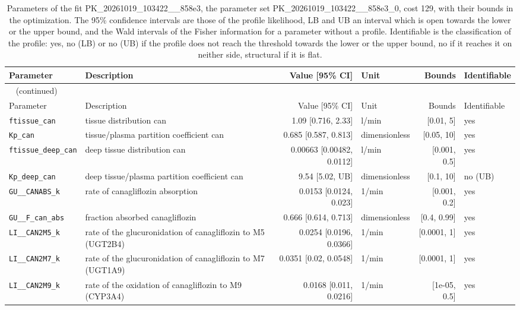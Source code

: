 \documentclass{article}
\begin{document}
\begin{longtable}{llrlrl}
\caption{Parameters of the fit PK\_20261019\_103422\_\_858e3, the parameter set PK\_20261019\_103422\_\_858e3\_0, cost 129, with their bounds in the optimization. The 95\% confidence intervals are those of the profile likelihood, LB and UB an interval which is open towards the lower or the upper bound, and the Wald intervals of the Fisher information for a parameter without a profile. Identifiable is the classification of the profile: yes, no (LB) or no (UB) if the profile does not reach the threshold towards the lower or the upper bound, no if it reaches it on neither side, structural if it is flat.}\label{tab:parameters:PK_20261019_103422__858e3} \\
\toprule
Parameter & Description & Value [95\% CI] & Unit & Bounds & Identifiable \\
\midrule
\endfirsthead
\multicolumn{6}{l}{\small\tablename~\thetable{} (continued)} \\
\toprule
Parameter & Description & Value [95\% CI] & Unit & Bounds & Identifiable \\
\midrule
\endhead
\bottomrule
\endlastfoot
\texttt{ftissue\_can} & tissue distribution can & 1.09 [0.716, 2.33] & l/min & [0.01, 5] & yes \\
\texttt{Kp\_can} & tissue/plasma partition coefficient can & 0.685 [0.587, 0.813] & dimensionless & [0.05, 10] & yes \\
\texttt{ftissue\_deep\_can} & deep tissue distribution can & 0.00663 [0.00482, 0.0112] & l/min & [0.001, 0.5] & yes \\
\texttt{Kp\_deep\_can} & deep tissue/plasma partition coefficient can & 9.54 [5.02, UB] & dimensionless & [0.1, 10] & no (UB) \\
\texttt{GU\_\_CANABS\_k} & rate of canagliflozin absorption & 0.0153 [0.0124, 0.023] & 1/min & [0.001, 0.2] & yes \\
\texttt{GU\_\_F\_can\_abs} & fraction absorbed canagliflozin & 0.666 [0.614, 0.713] & dimensionless & [0.4, 0.99] & yes \\
\texttt{LI\_\_CAN2M5\_k} & rate of the glucuronidation of canagliflozin to M5 (UGT2B4) & 0.0254 [0.0196, 0.0366] & 1/min & [0.0001, 1] & yes \\
\texttt{LI\_\_CAN2M7\_k} & rate of the glucuronidation of canagliflozin to M7 (UGT1A9) & 0.0351 [0.02, 0.0548] & 1/min & [0.0001, 1] & yes \\
\texttt{LI\_\_CAN2M9\_k} & rate of the oxidation of canagliflozin to M9 (CYP3A4) & 0.0168 [0.011, 0.0216] & 1/min & [1e-05, 0.5] & yes \\

\end{longtable}
\end{document}
